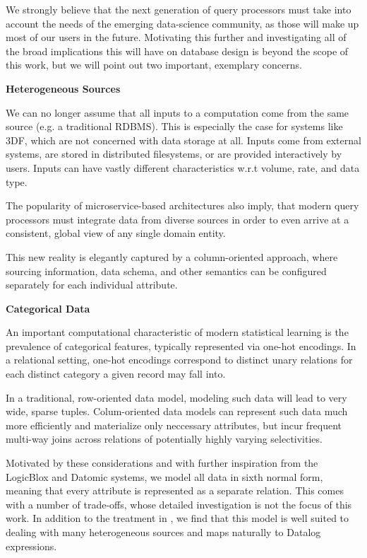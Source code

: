 \documentclass[../index.tex]{subfiles}
\begin{document}
We strongly believe that the next generation of query processors must
take into account the needs of the emerging data-science community, as
those will make up most of our users in the future. Motivating this
further and investigating all of the broad implications this will have
on database design is beyond the scope of this work, but we will point
out two important, exemplary concerns.

\textbf{Heterogeneous Sources}

We can no longer assume that all inputs to a computation come from the
same source (e.g. a traditional RDBMS). This is especially the case
for systems like 3DF, which are not concerned with data storage at
all. Inputs come from external systems, are stored in distributed
filesystems, or are provided interactively by users. Inputs can have
vastly different characteristics w.r.t volume, rate, and data type.

The popularity of microservice-based architectures also imply, that
modern query processors must integrate data from diverse sources in
order to even arrive at a consistent, global view of any single domain
entity.

This new reality is elegantly captured by a column-oriented approach,
where sourcing information, data schema, and other semantics can be
configured separately for each individual attribute.

\textbf{Categorical Data}

An important computational characteristic of modern statistical
learning is the prevalence of categorical features, typically
represented via one-hot encodings. In a relational setting, one-hot
encodings correspond to distinct unary relations for each distinct
category a given record may fall into.

In a traditional, row-oriented data model, modeling such data will
lead to very wide, sparse tuples. Colum-oriented data models can
represent such data much more efficiently and materialize only
neccessary attributes, but incur frequent multi-way joins across
relations of potentially highly varying selectivities.

Motivated by these considerations and with further inspiration from
the LogicBlox and Datomic systems, we model all data in sixth normal
form, meaning that every attribute is represented as a separate
relation. This comes with a number of trade-offs, whose detailed
investigation is not the focus of this work. In addition to the
treatment in \cite{aref2015design}, we find that this model is well
suited to dealing with many heterogeneous sources and maps naturally
to Datalog expressions.
\end{document}
